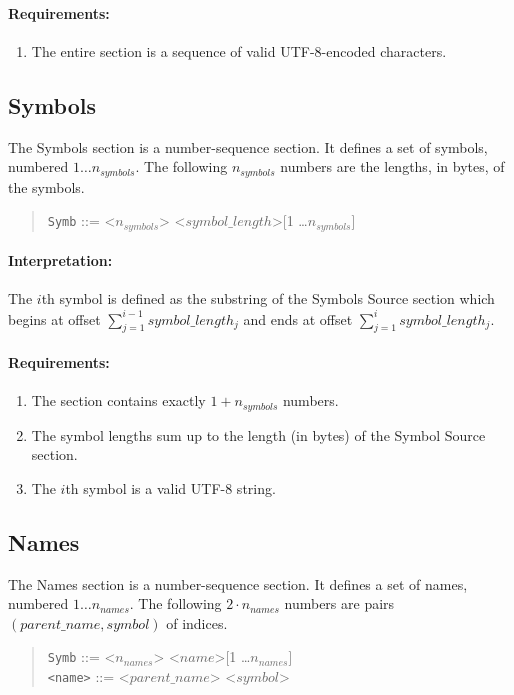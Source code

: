 \documentclass[a4paper]{report}
\begin{document}
\paragraph{Requirements:}
\begin{enumerate}
\item The entire section is a sequence of valid UTF-8-encoded characters.
\end{enumerate}

\subsection{Symbols}
The Symbols section is a number-sequence section. It defines a set of
symbols, numbered $1 \ldots n_{symbols}$.
The following $n_{symbols}$ numbers are the lengths, in bytes, of the symbols.
\begin{quote}
  \texttt{Symb} ::= <$n_{symbols}$> <$symbol\_length$>[1 \ldots $n_{symbols}$]
\end{quote}

\paragraph{Interpretation:}
The $i$th symbol is defined as the substring of the Symbols Source section
which begins at offset $\sum_{j=1}^{i-1} {symbol\_length_{j}}$
and ends at offset $\sum_{j=1}^{i} {symbol\_length_{j}}$.

\paragraph{Requirements:}
\begin{enumerate}
\item The section contains exactly $1 + n_{symbols}$ numbers.
\item The symbol lengths sum up to the length (in bytes) of the Symbol Source section.
\item The $i$th symbol is a valid UTF-8 string.
\end{enumerate}

\subsection{Names}
The Names section is a number-sequence section.
It defines a set of names, numbered $1 \ldots n_{names}$.
The following $2 \cdot n_{names}$ numbers are pairs $(parent\_name, symbol)$ of indices.

\begin{quote}
  \texttt{Symb} ::= <$n_{names}$> <$name$>[1 \ldots $n_{names}$]\\
  \texttt{<name>} ::= <$parent\_name$> <$symbol$>
\end{quote}
\end{document}
